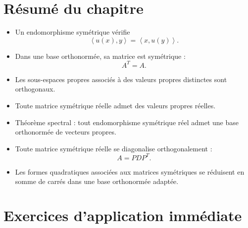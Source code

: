 \documentclass[11pt,a4paper]{article}
\theoremstyle{remark}
\newcommand{\scal}[2]{\left\langle #1,#2\right\rangle}
\begin{document}
\section{Résumé du chapitre}

\begin{itemize}
    \item Un endomorphisme symétrique vérifie
    \[
    \scal{u(x)}{y}=\scal{x}{u(y)}.
    \]
    \item Dans une base orthonormée, sa matrice est symétrique :
    \[
    A^T=A.
    \]
    \item Les sous-espaces propres associés à des valeurs propres distinctes sont orthogonaux.
    \item Toute matrice symétrique réelle admet des valeurs propres réelles.
    \item Théorème spectral : tout endomorphisme symétrique réel admet une base orthonormée de vecteurs propres.
    \item Toute matrice symétrique réelle se diagonalise orthogonalement :
    \[
    A=PDP^T.
    \]
    \item Les formes quadratiques associées aux matrices symétriques se réduisent en somme de carrés dans une base orthonormée adaptée.
\end{itemize}

\section*{Exercices d’application immédiate}
\end{document}
